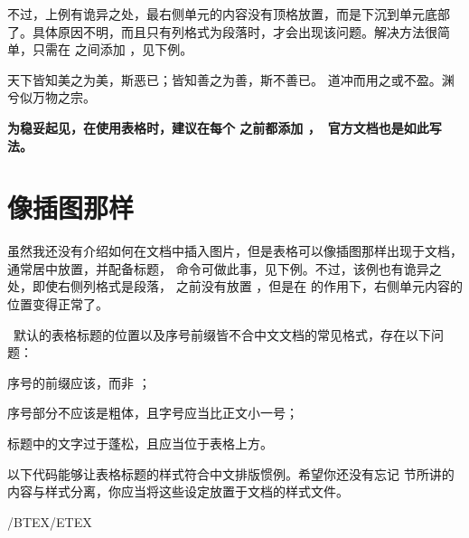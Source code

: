 不过，上例有诡异之处，最右侧单元的内容没有顶格放置，而是下沉到单元底部了。具体原因不明，而且只有列格式为段落时，才会出现该问题。解决方法很简单，只需在  之间添加 ，见下例。

\startexample
\starttabulate[|p|p|]
\TL[3]
\NC 天下皆知美之为美，斯恶已；皆知善之为善，斯不善已。
\VL 道冲而用之或不盈。渊兮似万物之宗。
\NC\NR  %
\BL[3]
\stoptabulate
\stopexample
\simpleexample[option=TEX]{\null}
\getexample

{\bf 为稳妥起见，在使用表格时，建议在每个  之前都添加 ，\CONTEXT\ 官方文档也是如此写法。}

\section{像插图那样}

虽然我还没有介绍如何在文档中插入图片，但是表格可以像插图那样出现于文档，通常居中放置，并配备标题， 命令可做此事，见下例。不过，该例也有诡异之处，即使右侧列格式是段落， 之前没有放置 ，但是在  的作用下，右侧单元内容的位置变得正常了。

\mainlanguage[en]
\startexample
{}
\stopexample
\simpleexample[option=TEX]{\null}
\getexample

\CONTEXT\ 默认的表格标题的位置以及序号前缀皆不合中文文档的常见格式，存在以下问题：

\startitemize[packed]
\item 序号的前缀应该，而非 ；
\item 序号部分不应该是粗体，且字号应当比正文小一号；
\item 标题中的文字过于蓬松，且应当位于表格上方。
\stopitemize

以下代码能够让表格标题的样式符合中文排版惯例。希望你还没有忘记 \in[style] 节所讲的内容与样式分离，你应当将这些设定放置于文档的样式文件。

\startTEX
\mainlanguage[cn]/BTEX/ETEX

\setupcaption
  [table][headstyle=normal, style=small, align=center, location=top]
\stopTEX


